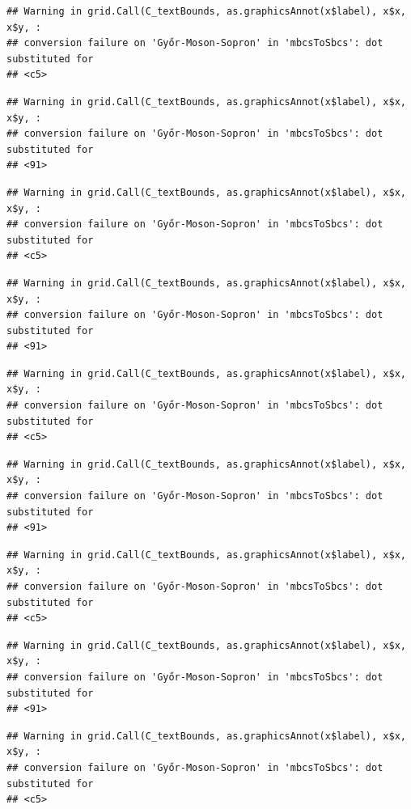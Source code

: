 \documentclass[
]{book}
\begin{document}
\begin{verbatim}
## Warning in grid.Call(C_textBounds, as.graphicsAnnot(x$label), x$x, x$y, :
## conversion failure on 'Győr-Moson-Sopron' in 'mbcsToSbcs': dot substituted for
## <c5>
\end{verbatim}

\begin{verbatim}
## Warning in grid.Call(C_textBounds, as.graphicsAnnot(x$label), x$x, x$y, :
## conversion failure on 'Győr-Moson-Sopron' in 'mbcsToSbcs': dot substituted for
## <91>
\end{verbatim}

\begin{verbatim}
## Warning in grid.Call(C_textBounds, as.graphicsAnnot(x$label), x$x, x$y, :
## conversion failure on 'Győr-Moson-Sopron' in 'mbcsToSbcs': dot substituted for
## <c5>
\end{verbatim}

\begin{verbatim}
## Warning in grid.Call(C_textBounds, as.graphicsAnnot(x$label), x$x, x$y, :
## conversion failure on 'Győr-Moson-Sopron' in 'mbcsToSbcs': dot substituted for
## <91>
\end{verbatim}

\begin{verbatim}
## Warning in grid.Call(C_textBounds, as.graphicsAnnot(x$label), x$x, x$y, :
## conversion failure on 'Győr-Moson-Sopron' in 'mbcsToSbcs': dot substituted for
## <c5>
\end{verbatim}

\begin{verbatim}
## Warning in grid.Call(C_textBounds, as.graphicsAnnot(x$label), x$x, x$y, :
## conversion failure on 'Győr-Moson-Sopron' in 'mbcsToSbcs': dot substituted for
## <91>
\end{verbatim}

\begin{verbatim}
## Warning in grid.Call(C_textBounds, as.graphicsAnnot(x$label), x$x, x$y, :
## conversion failure on 'Győr-Moson-Sopron' in 'mbcsToSbcs': dot substituted for
## <c5>
\end{verbatim}

\begin{verbatim}
## Warning in grid.Call(C_textBounds, as.graphicsAnnot(x$label), x$x, x$y, :
## conversion failure on 'Győr-Moson-Sopron' in 'mbcsToSbcs': dot substituted for
## <91>
\end{verbatim}

\begin{verbatim}
## Warning in grid.Call(C_textBounds, as.graphicsAnnot(x$label), x$x, x$y, :
## conversion failure on 'Győr-Moson-Sopron' in 'mbcsToSbcs': dot substituted for
## <c5>
\end{verbatim}
\end{document}
